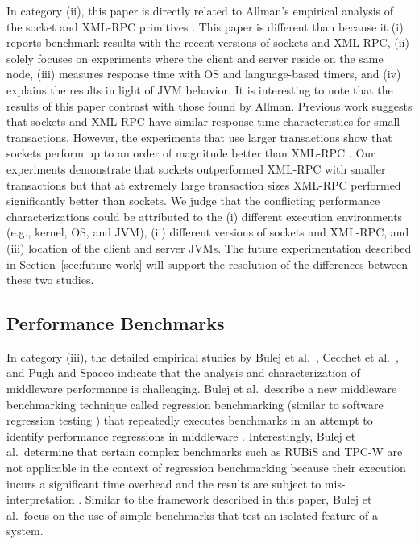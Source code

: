 \documentclass{sig-alternate}
\begin{document}
In category (ii), this paper is directly related to Allman's empirical
analysis of the socket and XML-RPC primitives \cite{allman-per}.  This
paper is different than \cite{allman-per} because it (i) reports
benchmark results with the recent versions of sockets and XML-RPC,
(ii) solely focuses on experiments where the client and server reside
on the same node, (iii) measures response time with OS and
language-based timers, and (iv) explains the results in light of JVM
behavior.  It is interesting to note that the results of this paper
contrast with those found by Allman.  Previous work suggests that
sockets and XML-RPC have similar response time characteristics for
small transactions.  However, the experiments that use larger
transactions show that sockets perform up to an order of magnitude
better than XML-RPC \cite{allman-per}.  Our experiments demonstrate
that sockets outperformed XML-RPC with smaller transactions but that
at extremely large transaction sizes XML-RPC performed significantly
better than sockets.  We judge that the conflicting performance
characterizations could be attributed to the (i) different execution
environments (e.g., kernel, OS, and JVM), (ii) different versions of
sockets and XML-RPC, and (iii) location of the client and server JVMs.
The future experimentation described in Section~\ref{sec:future-work}
will support the resolution of the differences between these two
studies.

\subsection{Performance Benchmarks}
\label{sec:middl-benchm}

In category (iii), the detailed empirical studies by Bulej et
al.\ \cite{bulej-final}, Cecchet et al.\ \cite{cacchet-ejb-perform},
and Pugh and Spacco \cite{pugh-rubis-revisit} indicate that the
analysis and characterization of middleware performance is
challenging.  Bulej et al.\ describe a new middleware benchmarking
technique called regression benchmarking (similar to software
regression testing
\cite{kapfhammer-testing-handbook,rothermel-safe,rummel-kanonizo-sac2005})
that repeatedly executes benchmarks in an attempt to identify
performance regressions in middleware \cite{bulej-final}.
Interestingly, Bulej et al.\ determine that certain complex benchmarks
such as RUBiS and TPC-W are not applicable in the context of
regression benchmarking because their execution incurs a significant
time overhead and the results are subject to mis-interpretation
\cite{bulej-final}.  Similar to the framework described in this paper,
Bulej et al.\ focus on the use of simple benchmarks that test an
isolated feature of a system.  %
\end{document}
